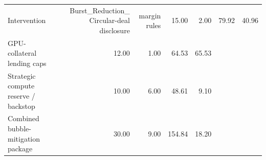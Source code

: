 \begin{tabular}{lrrrr}
\toprule
Intervention & Burst_Reduction_%
\midrule
Circular-deal disclosure & margin rules & 15.00 & 2.00 & 79.92 & 40.96 \\
GPU-collateral lending caps & 12.00 & 1.00 & 64.53 & 65.53 \\
Strategic compute reserve / backstop & 10.00 & 6.00 & 48.61 & 9.10 \\
Combined bubble-mitigation package & 30.00 & 9.00 & 154.84 & 18.20 \\
\bottomrule
\end{tabular}

